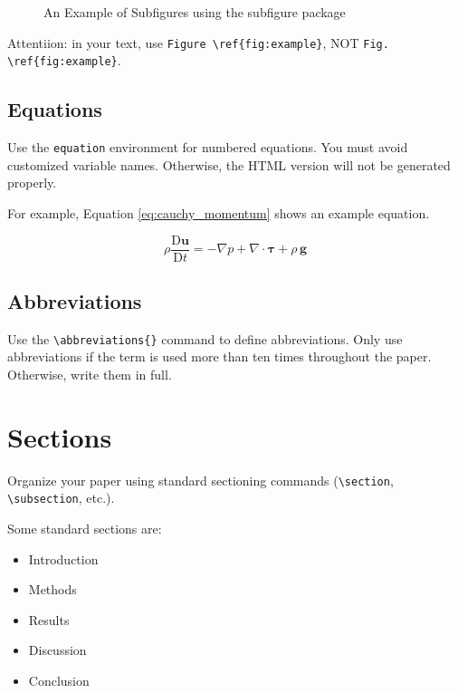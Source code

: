 \documentclass[
  manuscript=article,  %
  layout=preprint,  %
  year=20xx,
  volume=x,
]{extra/joas}
\begin{document}
\begin{figure}[htbp!]
  \centering
  \hspace{0.2cm}
  \caption{An Example of Subfigures using the subfigure package}
  \label{fig:subfig_example}
\end{figure}

Attentiion: in your text, use \verb|Figure \ref{fig:example}|, NOT \verb|Fig. \ref{fig:example}|.


\subsection{Equations}
Use the \verb|equation| environment for numbered equations. You must avoid customized variable names. Otherwise, the HTML version will not be generated properly.

For example, Equation \ref{eq:cauchy_momentum} shows an example equation.

\begin{equation} \label{eq:cauchy_momentum}
\rho\frac{\mathrm{D} \mathbf{u}}{\mathrm{D} t} = - \nabla p + \nabla \cdot \boldsymbol \tau + \rho\,\mathbf{g}
\end{equation}

\subsection{Abbreviations}
Use the \verb|\abbreviations{}| command to define abbreviations. Only use abbreviations if the term is used more than ten times throughout the paper. Otherwise, write them in full.


\section{Sections}

Organize your paper using standard sectioning commands (\verb|\section|, \verb|\subsection|, etc.).

Some standard sections are:

\begin{itemize}
  \item Introduction
  \item Methods
  \item Results
  \item Discussion
  \item Conclusion
\end{itemize}
\end{document}
